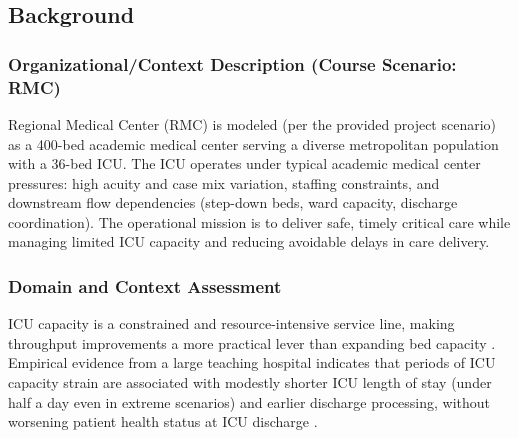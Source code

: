 \documentclass[12pt]{article}
\begin{document}
%
%

\subsection{Background}
\label{subsec:background}

%

\subsubsection*{Organizational/Context Description (Course Scenario: RMC)}
Regional Medical Center (RMC) is modeled (per the provided project scenario) as a 400-bed academic medical center serving a diverse metropolitan population with a 36-bed ICU. The ICU operates under typical academic medical center pressures: high acuity and case mix variation, staffing constraints, and downstream flow dependencies (step-down beds, ward capacity, discharge coordination). The operational mission is to deliver safe, timely critical care while managing limited ICU capacity and reducing avoidable delays in care delivery.


\subsubsection*{Domain and Context Assessment}
ICU capacity is a constrained and resource-intensive service line, making throughput improvements a more practical lever than expanding bed capacity \cite{halpern2010_critical_care_costs}. Empirical evidence from a large teaching hospital indicates that periods of ICU capacity strain are associated with modestly shorter ICU length of stay (under half a day even in extreme scenarios) and earlier discharge processing, without worsening patient health status at ICU discharge \cite{kim2025_capacity_strain_icu}. 
\end{document}
